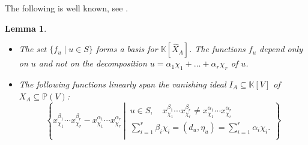 \documentclass[12pt, a4article]{amsart}   	%
\numberwithin{equation}{section}
\theoremstyle{plain}
\newtheorem{lemma}[theorem]{Lemma}
\theoremstyle{definition}
\begin{document}
The following is well known, see \cite{CLS}.
\begin{lemma}\label{explicit:basis:two:two}
\begin{itemize}
\item[{\rm (i)}] The set $\{f_{u}\mid u\in S \}$ forms a basis for $\mathbb K[\hat X_A]$. The functions $f_u$
depend only on $u$ and not on the decomposition $u= \alpha_1\chi_1+\ldots +\alpha_r\chi_r$ of $u$.
\item[{\rm (ii)}] The following functions linearly span the vanishing ideal $I_A\subseteq \mathbb K[V]$ of  $ X_{A}\subseteq \mathbb P(V)$:
$$
\left\{x_{\chi_1}^{\beta_1}\cdots x_{\chi_r}^{\beta_r} -x_{\chi_1}^{\alpha_1}\cdots x_{\chi_r}^{\alpha_r}\,\left\vert\, 
\begin{array}{c}
u \in S, \quad x_{\chi_1}^{\beta_1}\cdots x_{\chi_r}^{\beta_r} \not=x_{\chi_1}^{\alpha_1}\cdots x_{\chi_r}^{\alpha_r}\\
\sum_{i=1}^r \beta_i \chi_i=(d_u,\eta_u)=\sum_{i=1}^r \alpha_i \chi_i. \\
\end{array}\right.\right\}
$$
\end{itemize}
\end{lemma}

%
%
\end{document}
